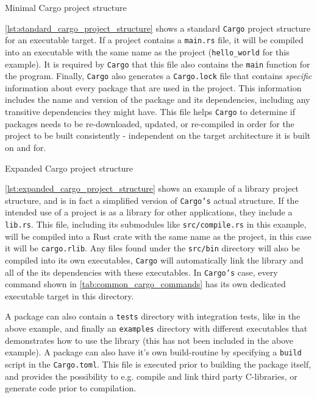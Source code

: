 \begin{listing}
\caption{Minimal Cargo project structure}
\label{lst:standard_cargo_project_structure}
\end{listing}

\autoref{lst:standard_cargo_project_structure} shows a standard \texttt{Cargo} project structure for an executable target.
If a project contains a \texttt{main.rs} file, it will be compiled into an executable with the same name as the project (\texttt{hello\_world} for this example).
It is required by \texttt{Cargo} that this file also contains the \texttt{main} function for the program.
Finally, \texttt{Cargo} also generates a \texttt{Cargo.lock} file that contains \emph{specific} information about every package that are used in the project.
This information includes the name and version of the package and its dependencies, including any transitive dependencies they might have.
This file helps \texttt{Cargo} to determine if packages needs to be re-downloaded, updated, or re-compiled in order for the project to be built consistently - independent on the target architecture it is built on and for.

\begin{listing}
\caption{Expanded Cargo project structure}
\label{lst:expanded_cargo_project_structure}
\end{listing}

\autoref{lst:expanded_cargo_project_structure} shows an example of a library project structure, and is in fact a simplified version of \texttt{Cargo's} actual structure.
If the intended use of a project is as a library for other applications, they include a \texttt{lib.rs}.
This file, including its submodules like \texttt{src/compile.rs} in this example, will be compiled into a Rust crate with the same name as the project, in this case it will be \texttt{cargo.rlib}.
Any files found under the \texttt{src/bin} directory will also be compiled into its own executables, \texttt{Cargo} will automatically link the library and all of the its dependencies with these executables.
In \texttt{Cargo's} case, every command shown in \autoref{tab:common_cargo_commands} has its own dedicated executable target in this directory.

A package can also contain a \texttt{tests} directory with integration tests, like in the above example, and finally an \texttt{examples} directory with different executables that demonstrates how to use the library (this has not been included in the above example).
A package can also have it's own build-routine by specifying a \texttt{build} script in the \texttt{Cargo.toml}.
This file is executed prior to building the package itself, and provides the possibility to e.g. compile and link third party C-libraries, or generate code prior to compilation.

